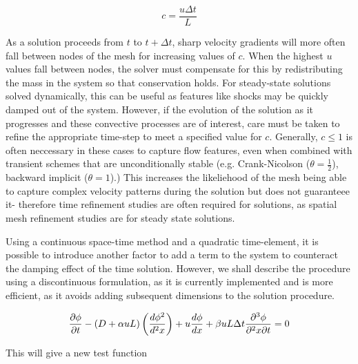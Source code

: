 \begin{equation}
 c=\frac{u\Delta{t}}{L}
\end{equation}

As a solution proceeds from $t$ to $t+\Delta{t}$, sharp velocity gradients will more often fall between nodes of the mesh for increasing values of $c$. When the highest $u$ values fall between nodes, the solver must compensate for this by redistributing the mass in the system so that conservation holds. For steady-state solutions solved dynamically, this can be useful as features like shocks may be quickly damped out of the system. However, if the evolution of the solution as it progresses and these convective processes are of interest, care must be taken to refine the appropriate time-step to meet a specified value for $c$. Generally, $c\le{1}$ is often neccessary in these cases to capture flow features, even when combined with transient schemes that are unconditionally stable (e.g. Crank-Nicolson ($\theta=\frac{1}{2}$), backward implicit ($\theta=1$).) This increases the likeliehood of the mesh being able to capture complex velocity patterns during the solution but does not guaranteee it- therefore time refinement studies are often required for solutions, as spatial mesh refinement studies are for steady state solutions. 


Using a continuous space-time method and a quadratic time-element, it is possible to introduce another factor to add a term to the system to counteract the damping effect of the time solution. However, we shall describe the procedure using a discontinuous formulation, as it is currently implemented and is more efficient, as it avoids adding subsequent dimensions to the solution procedure. 

\begin{equation}
  \frac{\partial\phi}{\partial{t}}-\left( D+{\alpha}uL \right)\left( \frac{d\phi^2}{d^2x} \right)+u\frac{d\phi}{dx}+\beta{uL\Delta{t}}\frac{\partial^3\phi}{\partial^2{x}\partial{t}}=0
\end{equation}

This will give a new test function 

